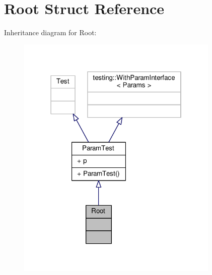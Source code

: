 \hypertarget{struct_root}{}\section{Root Struct Reference}
\label{struct_root}


Inheritance diagram for Root\+:
\nopagebreak
\begin{figure}[H]
\begin{center}
\leavevmode
\includegraphics[width=274pt]{struct_root__inherit__graph}
\end{center}
\end{figure}


